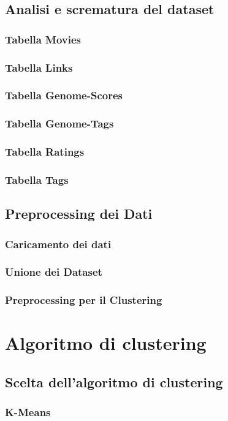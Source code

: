 \documentclass[a4paper,12pt]{article}
\begin{document}
\subsection{Analisi e scrematura del dataset}
\subsubsection{Tabella Movies}
\subsubsection{Tabella Links}
\subsubsection{Tabella Genome-Scores}
\subsubsection{Tabella Genome-Tags}
\subsubsection{Tabella Ratings}
\subsubsection{Tabella Tags}
\subsection{Preprocessing dei Dati}
\subsubsection{Caricamento dei dati}
\subsubsection{Unione dei Dataset}
\subsubsection{Preprocessing per il Clustering}
\section{Algoritmo di clustering}
\subsection{Scelta dell’algoritmo di clustering}
\subsubsection{K-Means}
\end{document}
